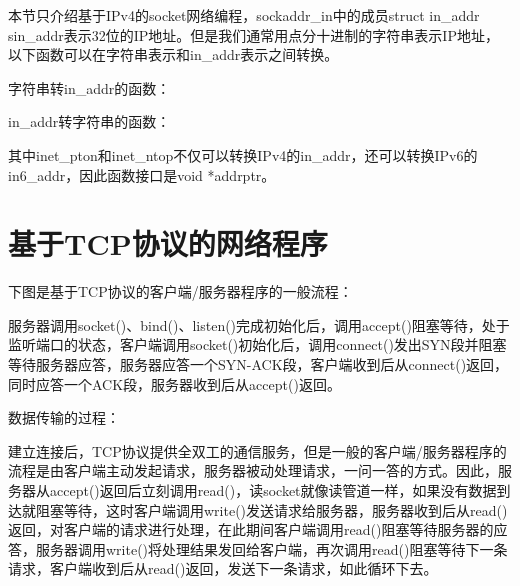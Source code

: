 

本节只介绍基于IPv4的socket网络编程，sockaddr\_\BookSplit{}in中的成员struct in\_\BookSplit{}addr sin\_\BookSplit{}addr表示32位的IP地址。但是我们通常用点分十进制的字符串表示IP地址，以下函数可以在字符串表示和in\_\BookSplit{}addr表示之间转换。



字符串转in\_\BookSplit{}addr的函数：




in\_\BookSplit{}addr转字符串的函数：




其中inet\_\BookSplit{}pton和inet\_\BookSplit{}ntop不仅可以转换IPv4的in\_\BookSplit{}addr，还可以转换IPv6的in6\_\BookSplit{}addr，因此函数接口是void *addrptr。




\section{基于TCP协议的网络程序}
%
下图是基于TCP协议的客户端/服务器程序的一般流程：




服务器调用socket()、bind()、listen()完成初始化后，调用accept()阻塞等待，处于监听端口的状态，客户端调用socket()初始化后，调用connect()发出SYN段并阻塞等待服务器应答，服务器应答一个SYN-ACK段，客户端收到后从connect()返回，同时应答一个ACK段，服务器收到后从accept()返回。



数据传输的过程：



建立连接后，TCP协议提供全双工的通信服务，但是一般的客户端/服务器程序的流程是由客户端主动发起请求，服务器被动处理请求，一问一答的方式。因此，服务器从accept()返回后立刻调用read()，读socket就像读管道一样，如果没有数据到达就阻塞等待，这时客户端调用write()发送请求给服务器，服务器收到后从read()返回，对客户端的请求进行处理，在此期间客户端调用read()阻塞等待服务器的应答，服务器调用write()将处理结果发回给客户端，再次调用read()阻塞等待下一条请求，客户端收到后从read()返回，发送下一条请求，如此循环下去。



